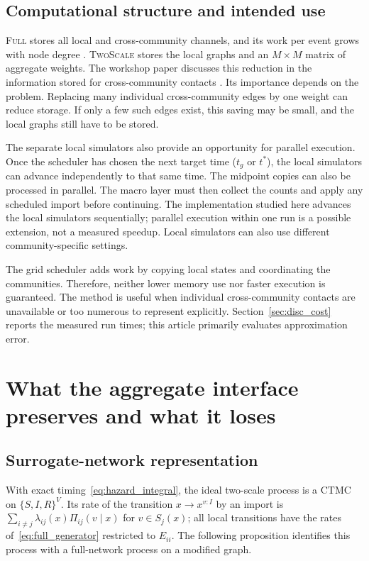\documentclass[a4paper,fleqn]{cas-sc}
\newcommand{\Full}{\textup{\textsc{Full}}}
\newcommand{\TS}{\textup{\textsc{TwoScale}}}
\begin{document}
\subsection{Computational structure and intended use}
\label{sec:cost}

\Full{} stores all local and cross-community channels, and its work per event grows with node degree \citep{kuryliak2025simulating}. \TS{} stores the local graphs and an $M\times M$ matrix of aggregate weights. The workshop paper discusses this reduction in the information stored for cross-community contacts \citep{kuryliak2025towards}. Its importance depends on the problem. Replacing many individual cross-community edges by one weight can reduce storage. If only a few such edges exist, this saving may be small, and the local graphs still have to be stored.

The separate local simulators also provide an opportunity for parallel execution. Once the scheduler has chosen the next target time ($t_g$ or $t^\ast$), the local simulators can advance independently to that same time. The midpoint copies can also be processed in parallel. The macro layer must then collect the counts and apply any scheduled import before continuing. The implementation studied here advances the local simulators sequentially; parallel execution within one run is a possible extension, not a measured speedup. Local simulators can also use different community-specific settings.

The grid scheduler adds work by copying local states and coordinating the communities. Therefore, neither lower memory use nor faster execution is guaranteed. The method is useful when individual cross-community contacts are unavailable or too numerous to represent explicitly. Section~\ref{sec:disc_cost} reports the measured run times; this article primarily evaluates approximation error.

\clearpage
\endgroup

\clearpage
\section{What the aggregate interface preserves and what it loses}
\label{sec:analysis}

\subsection{Surrogate-network representation}
\label{sec:surrogate}

With exact timing~\eqref{eq:hazard_integral}, the ideal two-scale process is a CTMC on $\{S,I,R\}^V$. Its rate of the transition $x\to x^{v:I}$ by an import is $\sum_{i\neq j}\lambda_{ij}(x)\Pi_{ij}(v\mid x)$ for $v\in S_j(x)$; all local transitions have the rates of~\eqref{eq:full_generator} restricted to $E_{ii}$. The following proposition identifies this process with a full-network process on a modified graph.
\end{document}

